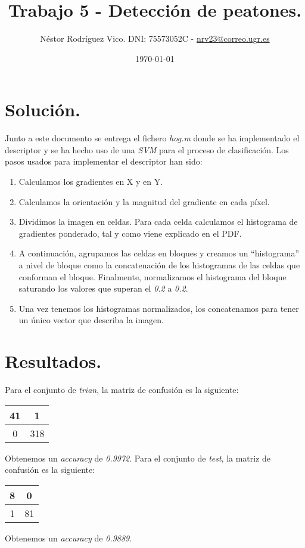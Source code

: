 \documentclass[11pt]{article}
\title{Trabajo 5 - Detección de peatones.}
\author{Néstor Rodríguez Vico. DNI: 75573052C - \href{mailto:nrv23@correo.ugr.es}{nrv23@correo.ugr.es}}
\date{\today}
\begin{document}
\maketitle

\setlength{\belowdisplayskip}{5pt} 
\setlength{\belowdisplayshortskip}{5pt}
\setlength{\abovedisplayskip}{5pt} 
\setlength{\abovedisplayshortskip}{5pt}

\section{Solución.}

Junto a este documento se entrega el fichero \textit{hog.m} donde se ha implementado el descriptor y se ha hecho uso de una \textit{SVM} para el proceso de clasificación. Los pasos usados para implementar el descriptor han sido:

\begin{enumerate}
	\item Calculamos los gradientes en X y en Y.
	\item Calculamos la orientación y la magnitud del gradiente en cada píxel.
	\item Dividimos la imagen en celdas. Para cada celda calculamos el histograma de gradientes ponderado, tal y como viene explicado en el PDF.
	\item A continuación, agrupamos las celdas en bloques y creamos un ``histograma'' a nivel de bloque como la concatenación de los histogramas de las celdas que conforman el bloque. Finalmente, normalizamos el histograma del bloque saturando los valores que superan el \textit{0.2} a \textit{0.2}.
	\item Una vez tenemos los histogramas normalizados, los concatenamos para tener un único vector que describa la imagen.
\end{enumerate}

\section{Resultados.}

Para el conjunto de \textit{trian}, la matriz de confusión es la siguiente:

\begin{table}[H]
	\centering
	\begin{tabular}{c|c}
		41 & 1 \\ \hline
		0 & 318
	\end{tabular}
\end{table}

Obtenemos un \textit{accuracy} de \textit{0.9972}. Para el conjunto de \textit{test}, la matriz de confusión es la siguiente:

\begin{table}[H]
	\centering
	\begin{tabular}{c|c}
		8 & 0 \\ \hline
		1 & 81
	\end{tabular}
\end{table}

Obtenemos un \textit{accuracy} de \textit{0.9889}.
\end{document}
